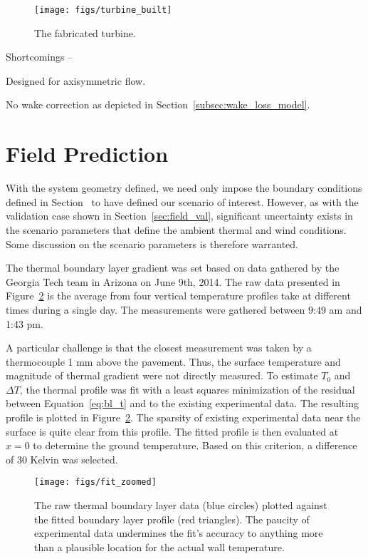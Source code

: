   \begin{figure}
   \centering
   \texttt{[image: figs/turbine\_built]}
   \caption{The fabricated turbine.} 
   \label{fig:turbine_built}
  \end{figure}

Shortcomings -- 

Designed for axisymmetric flow. 

No wake correction as depicted in Section~\ref{subsec:wake_loss_model}.    

\section{Field Prediction}
\label{subsec:field_predict}

With the system geometry defined, we need only impose the boundary
conditions defined in Section~\label{sec:bc} to have defined our
scenario of interest. However, as with the validation case shown in
Section~\ref{sec:field_val}, significant uncertainty exists in the
scenario parameters that define the ambient thermal and wind
conditions. Some discussion on the scenario parameters is therefore
warranted. 

The thermal boundary layer gradient was set based on data gathered by 
the Georgia Tech team in Arizona on June 9th, 2014. The raw data
presented in Figure~\ref{fig:thermal_profile_fit} is the average from
four vertical temperature profiles take at different times during a
single day. The measurements were gathered between 9:49 am and 1:43
pm\cite{ann_comm}.  

A particular challenge is that the closest measurement was taken by a 
thermocouple 1 mm above the pavement. Thus, the surface temperature and
magnitude of thermal gradient were not directly measured. To estimate
$T_0$ and $\Delta T$, the thermal profile was fit with a least squares
minimization of the residual between Equation~\ref{eq:bl_t} and to the
existing experimental data. The resulting profile is plotted in
Figure~\ref{fig:thermal_profile_fit}. The sparsity of existing
experimental data near the surface is quite clear from this
profile. The fitted profile is then evaluated at $x=0$ to determine the
ground temperature. Based on this criterion, a difference of 30 Kelvin was
selected.   

 \begin{figure}[!htb]
  \begin{center}
   \texttt{[image: figs/fit\_zoomed]}
   \caption{The raw thermal boundary layer data (blue circles) plotted
   against the fitted boundary layer profile (red triangles). The
   paucity of experimental data undermines the fit's accuracy to
   anything more than a plausible location for the actual wall
   temperature. }  
   \label{fig:thermal_profile_fit}
  \end{center}
 \end{figure}

